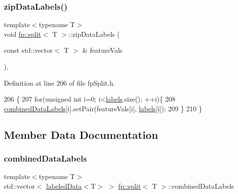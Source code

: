 \subsubsection{\texorpdfstring{zip\+Data\+Labels()}{zipDataLabels()}}
{\footnotesize\ttfamily template$<$typename T$>$ \\
void \hyperlink{classfp_1_1split}{fp\+::split}$<$ T $>$\+::zip\+Data\+Labels (\begin{DoxyParamCaption}\item[{const std\+::vector$<$ T $>$ \&}]{feature\+Vals }\end{DoxyParamCaption})\hspace{0.3cm}{\ttfamily [inline]}, {\ttfamily [protected]}}



Definition at line 206 of file fp\+Split.\+h.


\begin{DoxyCode}
206                                                                           \{
207                     \textcolor{keywordflow}{for}(\textcolor{keywordtype}{unsigned} \textcolor{keywordtype}{int} i=0; i<\hyperlink{classfp_1_1split_a9658b163c2cd30e9900e21c3b1c3f2f9}{labels}.size(); ++i)\{
208                         \hyperlink{classfp_1_1split_ac8f54cf4a42335814e10e351c49e3c32}{combinedDataLabels}[i].setPair(featureVals[i],
      \hyperlink{classfp_1_1split_a9658b163c2cd30e9900e21c3b1c3f2f9}{labels}[i]);
209                     \}
210                 \}
\end{DoxyCode}


\subsection{Member Data Documentation}
\mbox{\label{classfp_1_1split_ac8f54cf4a42335814e10e351c49e3c32}} 
\subsubsection{\texorpdfstring{combined\+Data\+Labels}{combinedDataLabels}}
{\footnotesize\ttfamily template$<$typename T$>$ \\
std\+::vector$<$ \hyperlink{classfp_1_1labeledData}{labeled\+Data}$<$T$>$ $>$ \hyperlink{classfp_1_1split}{fp\+::split}$<$ T $>$\+::combined\+Data\+Labels\hspace{0.3cm}{\ttfamily [protected]}}



